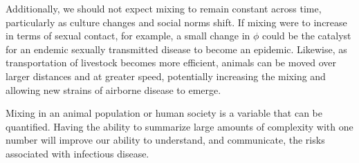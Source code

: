 \documentclass[10pt]{article}
\begin{document}
\begin{multicols}{2}


Additionally, we should not expect mixing to remain constant across time, particularly as culture changes and social norms shift. If mixing were to increase in terms of sexual contact, for example, a small change in $\phi$ could be the catalyst for an endemic sexually transmitted disease to become an epidemic. Likewise, as transportation of livestock becomes more efficient, animals can be moved over larger distances and at greater speed, potentially increasing the mixing and allowing new strains of airborne disease to emerge.

Mixing in an animal population or human society is a variable that can be quantified. Having the ability to summarize large amounts of complexity with one number will improve our ability to understand, and communicate, the risks associated with infectious disease.

\end{multicols}
\small


\normalsize
\end{document}
